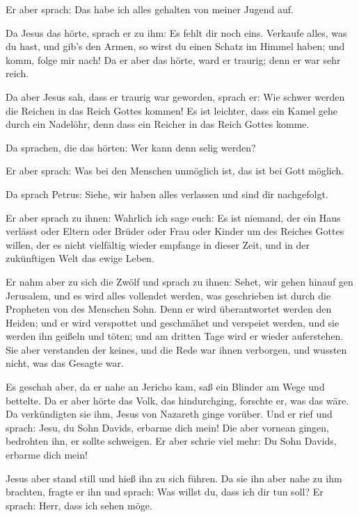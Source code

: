  Er aber sprach: Das habe ich alles gehalten von meiner
Jugend auf.

 Da Jesus das hörte, sprach er zu ihm: Es fehlt dir noch
eins. Verkaufe alles, was du hast, und gib's den Armen, so wirst du
einen Schatz im Himmel haben; und komm, folge mir nach! 
Da er aber das hörte, ward er traurig; denn er war sehr reich.

 Da aber Jesus sah, dass er traurig war geworden, sprach
er: Wie schwer werden die Reichen in das Reich Gottes kommen!
 Es ist leichter, dass ein Kamel gehe durch ein Nadelöhr,
denn dass ein Reicher in das Reich Gottes komme.

 Da sprachen, die das hörten: Wer kann denn selig werden?

 Er aber sprach: Was bei den Menschen unmöglich ist, das
ist bei Gott möglich.

 Da sprach Petrus: Siehe, wir haben alles verlassen und
sind dir nachgefolgt.

 Er aber sprach zu ihnen: Wahrlich ich sage euch: Es ist
niemand, der ein Haus verlässt oder Eltern oder Brüder oder Frau oder
Kinder um des Reiches Gottes willen,  der es nicht
vielfältig wieder empfange in dieser Zeit, und in der zukünftigen Welt
das ewige Leben.

 Er nahm aber zu sich die Zwölf und sprach zu ihnen:
Sehet, wir gehen hinauf gen Jerusalem, und es wird alles vollendet
werden, was geschrieben ist durch die Propheten von des Menschen Sohn.
 Denn er wird überantwortet werden den Heiden; und er
wird verspottet und geschmähet und verspeiet werden,  und
sie werden ihn geißeln und töten; und am dritten Tage wird er wieder
auferstehen.  Sie aber verstanden der keines, und die
Rede war ihnen verborgen, und wussten nicht, was das Gesagte war.

 Es geschah aber, da er nahe an Jericho kam, saß ein
Blinder am Wege und bettelte.  Da er aber hörte das Volk,
das hindurchging, forschte er, was das wäre.  Da
verkündigten sie ihm, Jesus von Nazareth ginge vorüber. 
Und er rief und sprach: Jesu, du Sohn Davids, erbarme dich mein!
 Die aber vornean gingen, bedrohten ihn, er sollte
schweigen. Er aber schrie viel mehr: Du Sohn Davids, erbarme dich mein!

 Jesus aber stand still und hieß ihn zu sich führen. Da
sie ihn aber nahe zu ihm brachten, fragte er ihn  und
sprach: Was willst du, dass ich dir tun soll? Er sprach: Herr, dass ich
sehen möge.

